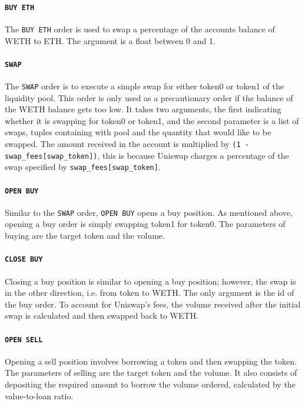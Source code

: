 \paragraph{\texttt{BUY\ ETH}}
The \texttt{BUY\ ETH} order is used to swap a percentage of the accounts balance of WETH to ETH. The argument is a float between 0 and 1.
\vspace{-3mm}
\paragraph{\texttt{SWAP}}
The \texttt{SWAP} order is to execute a simple swap for either token0 or token1 of the liquidity pool. This order is only used as a precautionary order if the balance of the WETH balance gets too low. It takes two arguments, the first indicating whether it is swapping for token0 or token1, and the second parameter is a list of swaps, tuples containing with pool and the quantity that would like to be swapped. The amount received in the account is multiplied by \texttt{(1 - swap\_fees[swap\_token])}, this is because Uniswap charges a percentage of the swap specified by \texttt{swap\_fees[swap\_token]}.
\vspace{-3mm}
\paragraph{\texttt{OPEN\ BUY}}
Similar to the \texttt{SWAP} order, \texttt{OPEN\ BUY} opens a buy position. As mentioned above, opening a buy order is simply swapping token1 for token0. The parameters of buying are the target token and the volume. 
\vspace{-3mm}
\paragraph{\texttt{CLOSE\ BUY}}
Closing a buy position is similar to opening a buy position; however, the swap is in the other direction, i.e. from token to WETH. The only argument is the id of the buy order. To account for Uniswap's fees, the volume received after the initial swap is calculated and then swapped back to WETH.
\vspace{-3mm}
\paragraph{\texttt{OPEN\ SELL}}
Opening a sell position involves borrowing a token and then swapping the token. The parameters of selling are the target token and the volume. It also consists of depositing the required amount to borrow the volume ordered, calculated by the value-to-loan ratio.
\vspace{-3mm}
